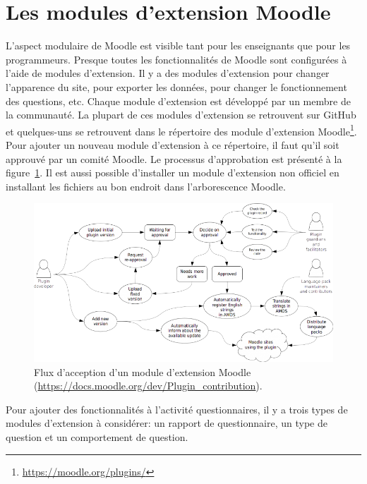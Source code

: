 \section{Les modules d'extension Moodle}
L'aspect modulaire de Moodle est visible tant pour les enseignants que pour les programmeurs.
Presque toutes les fonctionnalit\'es de Moodle sont configur\'ees \`a l'aide de modules d'extension.
Il y a des modules d'extension pour changer l'apparence du site, pour exporter les donn\'ees, pour changer le fonctionnement des questions, etc.
Chaque module d'extension est d\'evelopp\'e par un membre de la communaut\'e.
La plupart de ces modules d'extension se retrouvent sur GitHub et quelques-uns se retrouvent dans le r\'epertoire des module d'extension Moodle\footnote{\url{https://moodle.org/plugins/}}.
Pour ajouter un nouveau module d'extension \`a ce r\'epertoire, il faut qu'il soit approuv\'e par un comit\'e Moodle.
Le processus d'approbation est pr\'esent\'e \`a la figure~\ref{plugin-workflow}.
%
Il est aussi possible d'installer un module d'extension non officiel en installant les fichiers au bon endroit dans l'arborescence Moodle.
\begin{figure}[h!]
  \includegraphics[scale=0.7]{images/plugin-contribution-workflow.png}
  \caption[Flux d'acception d'un module d'extension Moodle]{Flux d'acception d'un module d'extension Moodle (\href{https://docs.moodle.org/dev/Plugin_contribution}{\url{https://docs.moodle.org/dev/Plugin\_contribution}}).}
  \label{plugin-workflow}
\end{figure}

Pour ajouter des fonctionnalit\'es \`a l'activit\'e questionnaires, il y a trois types de modules d'extension \`a consid\'erer: un rapport de questionnaire, un type de question et un comportement de question.

